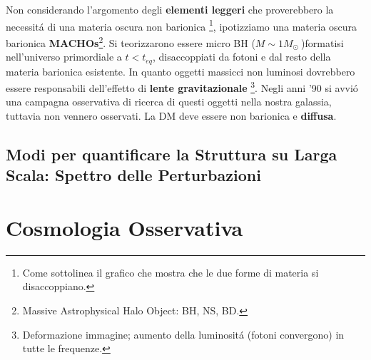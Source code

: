 \documentclass[12pt, a4paper]{article}
\begin{document}
Non considerando l'argomento degli \textbf{elementi leggeri} che proverebbero la necessit\'{a} di una materia oscura non barionica \footnote{Come sottolinea il grafico che mostra che le due forme di materia si disaccoppiano.}, ipotizziamo una materia oscura barionica \textbf{MACHOs}\footnote{Massive Astrophysical Halo Object: BH, NS, BD.}. Si teorizzarono essere micro BH ($M\sim 1 M_\odot\ $)formatisi nell'universo primordiale a $ t<t_{eq}$, disaccoppiati da fotoni e dal resto della materia barionica esistente. In quanto oggetti massicci non luminosi dovrebbero essere responsabili dell'effetto di \textbf{lente gravitazionale} \footnote{Deformazione immagine; aumento della luminosit\'{a} (fotoni convergono) in tutte le frequenze.}. Negli anni '90 si avvi\'{o} una campagna osservativa di ricerca di questi oggetti nella nostra galassia, tuttavia non vennero osservati. La DM deve essere non barionica e \textbf{diffusa}.
\subsection{Modi per quantificare la Struttura su Larga Scala: Spettro delle Perturbazioni}


























\newpage
\section{Cosmologia Osservativa}
\end{document}
